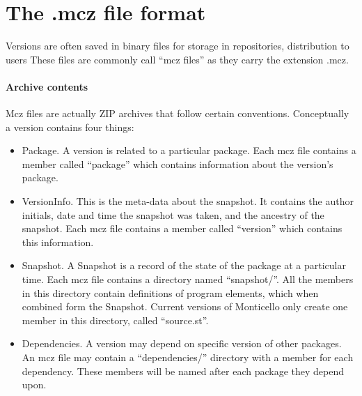 \documentclass[a4paper,10pt,twoside]{book}
\begin{document}



\section{The .mcz file format}

Versions are often saved in binary files for storage in repositories, distribution to users \etc
These files are commonly call ``mcz files'' as they carry the extension .mcz.

\paragraph{Archive contents}

Mcz files are actually ZIP archives that follow certain conventions. Conceptually a version contains four things:

\begin{itemize}
\item Package. A version is related to a particular package. Each mcz file contains a member called ``package'' which contains information about the version's package.

\item VersionInfo. This is the meta-data about the snapshot. It contains the author initials, date and time the snapshot was taken, and the ancestry of the snapshot. Each mcz file contains a member called ``version'' which contains this information.
\item Snapshot. A Snapshot is a record of the state of the package at a particular time. Each mcz file contains a directory named ``snapshot/''. All the members in this directory contain definitions of program elements, which when combined form the Snapshot. Current versions of Monticello only create one member in this directory, called ``source.st''.
\item Dependencies. A version may depend on specific version of other packages. An mcz file may contain a ``dependencies/'' directory with a member for each dependency. These members will be named after each package they depend upon.
\end{itemize}
\end{document}
